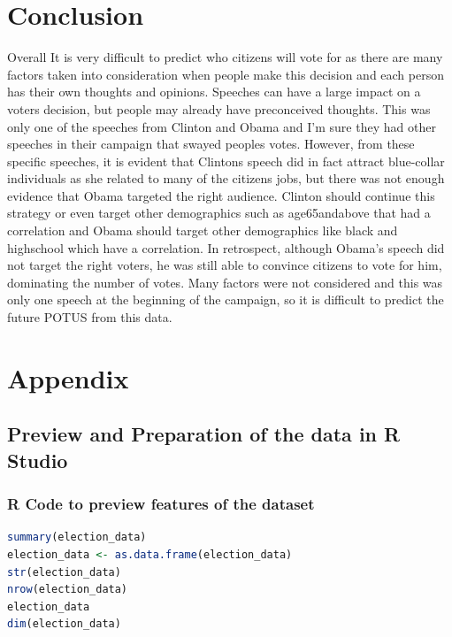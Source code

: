 \documentclass[11pt]{article}
\begin{document}
\section{Conclusion}
Overall It is very difficult to predict who citizens will vote for as there are many factors taken into consideration when people make this decision and each person has their own thoughts and opinions. Speeches can have a large impact on a voters decision, but people may already have preconceived thoughts. This was only one of the speeches from Clinton and Obama and I’m sure they had other speeches in their campaign that swayed peoples votes. However, from these specific speeches, it is evident that Clintons speech did in fact attract blue-collar individuals as she related to many of the citizens jobs, but there was not enough evidence that Obama targeted the right audience. Clinton should continue this strategy or even target other demographics such as age65andabove that had a correlation and Obama should target other demographics like black and highschool which have a correlation. In retrospect, although Obama’s speech did not target the right voters, he was still able to convince citizens to vote for him, dominating the number of votes. Many factors were not considered and this was only one speech at the beginning of the campaign, so it is difficult to predict the future POTUS from this data. 



\newpage
{}%
\renewcommand*{\thepage}{A\arabic{page}}
\appendix 

\section{Appendix}
\subsection{Preview and Preparation of the data in R Studio}
\subsubsection{R Code to preview features of the dataset}
\begin{lstlisting}[language=R]
summary(election_data)
election_data <- as.data.frame(election_data)
str(election_data)
nrow(election_data)
election_data
dim(election_data)
\end{lstlisting}
\end{document}
